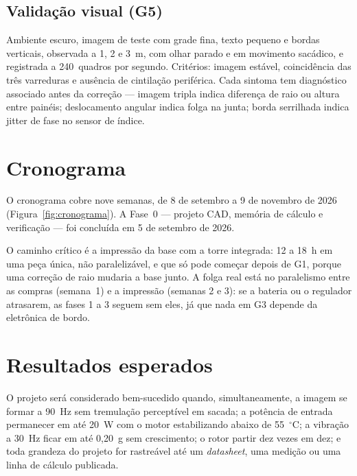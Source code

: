 \documentclass[10pt,a4paper,twocolumn]{article}
\begin{document}
\subsection{Validação visual (G5)}

Ambiente escuro, imagem de teste com grade fina, texto pequeno e bordas
verticais, observada a 1, 2 e 3~m, com olhar parado e em movimento sacádico, e
registrada a 240~quadros por segundo. Critérios: imagem estável, coincidência
das três varreduras e ausência de cintilação periférica. Cada sintoma tem
diagnóstico associado antes da correção --- imagem tripla indica diferença de
raio ou altura entre painéis; deslocamento angular indica folga na junta; borda
serrilhada indica jitter de fase no sensor de índice.


\section{Cronograma}

O cronograma cobre nove semanas, de 8 de setembro a 9 de novembro de 2026
(Figura~\ref{fig:cronograma}). A Fase~0 --- projeto CAD, memória de cálculo e
verificação --- foi concluída em 5 de setembro de 2026.

O caminho crítico é a impressão da base com a torre integrada: 12 a 18~h em uma
peça única, não paralelizável, e que só pode começar depois de G1, porque uma
correção de raio mudaria a base junto. A folga real está no paralelismo entre
as compras (semana~1) e a impressão (semanas 2 e 3): se a bateria ou o
regulador atrasarem, as fases 1 a 3 seguem sem eles, já que nada em G3 depende
da eletrônica de bordo.


\section{Resultados esperados}

O projeto será considerado bem-sucedido quando, simultaneamente, a imagem se
formar a 90~Hz sem tremulação perceptível em sacada; a potência de entrada
permanecer em até 20~W com o motor estabilizando abaixo de 55~$^\circ$C; a
vibração a 30~Hz ficar em até 0,20~g sem crescimento; o rotor partir dez vezes
em dez; e toda grandeza do projeto for rastreável até um \emph{datasheet}, uma
medição ou uma linha de cálculo publicada.
\end{document}
